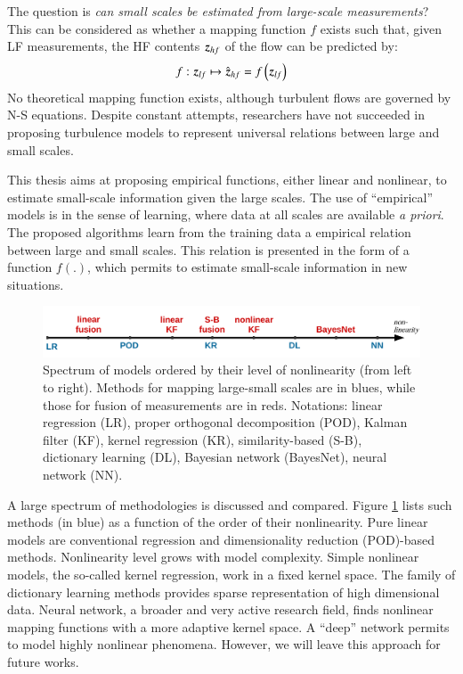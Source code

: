 The question is \textit{can small scales be estimated from large-scale measurements}? This can be considered as whether a mapping function $ f $ exists such that, given LF measurements, the HF contents $ \operatorname{\boldsymbol{z}}_{hf} $ of the flow can be predicted by:
\begin{equation}
f:  \operatorname{\boldsymbol{z}}_{lf} \mapsto  \hat{\operatorname{\boldsymbol{z}} }_{hf}  = f \left(\operatorname{\boldsymbol{z}}_{lf}\right)
\end{equation}
No theoretical mapping function exists, although turbulent flows are governed by N-S equations. Despite constant attempts, researchers have not succeeded in proposing turbulence models to represent universal relations between large and small scales.

This thesis aims at proposing empirical functions, either linear and nonlinear, to estimate small-scale information given the large scales. The use of ``empirical'' models is in the sense of learning, where data at all scales are available \textit{a priori}. The proposed algorithms learn from the training data a empirical relation between large and small scales. This relation is presented in the form of a function $ f(.) $, which permits to estimate small-scale information in new situations.

\begin{figure}
\centering
	\includegraphics[width=\columnwidth]{./images/probdef/turbulence/models_spectrum.pdf}
	\caption{\label{fig:models_spectrum} Spectrum of models ordered by their level of nonlinearity (from left to right). Methods for mapping large-small scales are in blues, while those for fusion of measurements are in reds. Notations: linear regression (LR), proper orthogonal decomposition (POD), Kalman filter (KF), kernel regression (KR), similarity-based (S-B), dictionary learning (DL), Bayesian network (BayesNet), neural network (NN).}
\end{figure}

A large spectrum of methodologies is discussed and compared. Figure \ref{fig:models_spectrum} lists such methods (in blue) as a function of the order of their nonlinearity. Pure linear models are conventional regression and dimensionality reduction (POD)-based methods. Nonlinearity level grows with model complexity. Simple nonlinear models, the so-called kernel regression, work in a fixed kernel space. The family of dictionary learning methods provides sparse representation of high dimensional data. Neural network, a broader and very active research field, finds nonlinear mapping functions with a more adaptive kernel space. A ``deep'' network permits to model highly nonlinear phenomena. However, we will leave this approach for future works.

